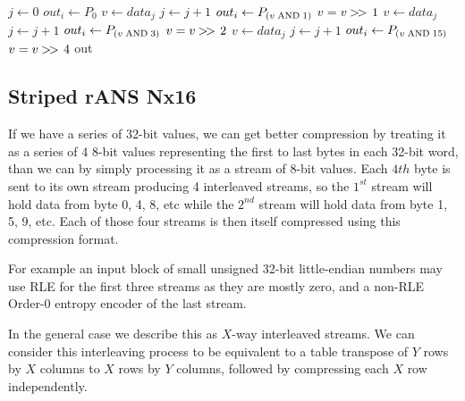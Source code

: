 \documentclass[a4paper]{article}
\begin{document}
\begin{algorithmic}[1]
  \State $j \gets 0$ 
   
      \State $out_i \gets P_0$
    \EndFor
  \Statex
   
        \State $v \gets data_j$
        \State $j \gets j+1$
      \EndIf
      \State $out_i \gets P_{(v \bitand 1)}$
      \State $v = v \mathbin{>\mkern-3mu>\,} 1$
    \EndFor
  \Statex
   
        \State $v \gets data_j$
        \State $j \gets j+1$
      \EndIf
      \State $out_i \gets P_{(v \bitand 3)}$
      \State $v = v \mathbin{>\mkern-3mu>\,} 2$
    \EndFor
  \Statex
   
        \State $v \gets data_j$
        \State $j \gets j+1$
      \EndIf
      \State $out_i \gets P_{(v \bitand 15)}$
      \State $v = v \mathbin{>\mkern-3mu>\,} 4$
    \EndFor
  \Statex
  \Else
    \State {}
  \EndIf
  \Statex
  \State \Return out
\EndFunction
\end{algorithmic}


\subsection{Striped rANS Nx16}
\label{sec:ransstripe}

If we have a series of 32-bit values, we can get better compression by
treating it as a series of 4 8-bit values representing the first to
last bytes in each 32-bit word, than we can by simply processing it as
a stream of 8-bit values.
Each $4{th}$ byte is sent to its own stream producing 4 interleaved streams, so the $1^{st}$ stream will hold data from byte 0, 4, 8, etc while the $2^{nd}$ stream will hold data from byte 1, 5, 9, etc.
Each of those four streams is then itself compressed using this compression format.

For example an input block of small unsigned 32-bit little-endian numbers may use RLE for the first three streams as they are mostly zero, and a non-RLE Order-0 entropy encoder of the last stream.

In the general case we describe this as $X$-way interleaved streams.
We can consider this interleaving process to be equivalent to a table
transpose of $Y$ rows by $X$ columns to $X$ rows by $Y$ columns,
followed by compressing each $X$ row independently.
\end{document}
